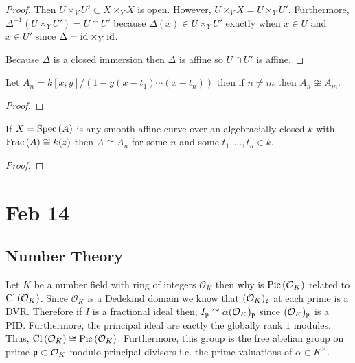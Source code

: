 \documentclass[12pt]{article}
\begin{document}
\begin{proof}
Then $U \times_V U' \subset X \times_Y X$ is open. However, $U \times_V X = U \times_Y U'$. Furthermore, $\Delta^{-1}(U \times_Y U') = U \cap U'$ because $\Delta(x) \in U \times_Y U'$ exactly when $x \in U$ and $x \in U'$ since $\Delta = \mathrm{id} \times_Y \mathrm{id}$.
\begin{center}
\end{center}
Because $\Delta$ is a closed immersion then $\Delta$ is affine so $U \cap U'$ is affine. 
\end{proof}

\begin{proposition}
Let $A_n = k[x,y]/(1 - y(x - t_1) \cdots (x - t_n))$ then if $n \neq m$ then $A_n \not\cong A_m$. 
\end{proposition}

\begin{proof}

\end{proof}

\begin{proposition}
If $X = \mathrm{Spec}\left( A \right)$ is any smooth affine curve over an algebracially closed $k$ with $\mathrm{Frac}\left(A\right) \cong k(z)$ then $A \cong A_n$ for some $n$ and some $t_1, \dots, t_n \in k$.
\end{proposition}

\begin{proof}

\end{proof}

\section{Feb 14}

\subsection{Number Theory}

\newcommand{\ints}[1]{\mathcal{O}_{#1}}

Let $K$ be a number field with ring of integers $\ints{K}$ then why is $\Pic{\ints{K}}$ related to $\Cl{\ints{K}}$. Since $\ints{K}$ is a Dedekind domain we know that $(\ints{K})_\p$ at each prime is a DVR. Therefore if $I$ is a fractional ideal then, $I_\p \cong \alpha (\ints{K})_\p$ since $(\ints{K})_\p$ is a PID. Furthermore, the principal ideal are eactly the globally rank $1$ modules. Thus, $\Cl{\ints{K}} \cong \Pic{\ints{K}}$. Furthermore, this group is the free abelian group on prime $\p \subset \ints{K}$ modulo principal divisors i.e. the prime valuations of $\alpha \in K^\times$.
\end{document}

